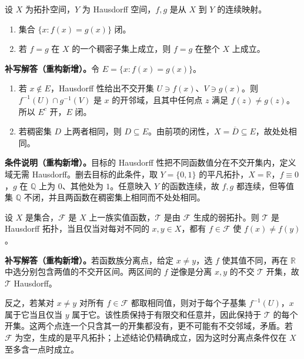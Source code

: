 \documentclass[../../main.tex]{subfiles}%
\begin{document}
\begin{exercise}\label{exercise:ch04-equalizer}
设 $X$ 为拓扑空间，$Y$ 为 Hausdorff 空间，$f,g$ 是从 $X$ 到 $Y$ 的连续映射。
\begin{enumerate}
\item\label{item:ch04-equalizer-closed} 集合 $\{x:f(x)=g(x)\}$ 闭。
\item\label{item:ch04-equalizer-dense} 若 $f=g$ 在 $X$ 的一个稠密子集上成立，则 $f=g$ 在整个 $X$ 上成立。
\end{enumerate}
\end{exercise}
\begin{solution}
\textbf{补写解答（重构新增）。}令 $E=\{x:f(x)=g(x)\}$。
\begin{enumerate}
\item 若 $x\notin E$，Hausdorff 性给出不交开集 $U\ni f(x)$、$V\ni g(x)$。则 $f^{-1}(U)\cap g^{-1}(V)$ 是 $x$ 的开邻域，且其中任何点 $z$ 满足 $f(z)\ne g(z)$。所以 $E^c$ 开，$E$ 闭。
\item 若稠密集 $D$ 上两者相同，则 $D\subseteq E$。由前项的闭性，$X=\overline D\subseteq E$，故处处相同。
\end{enumerate}
\end{solution}
\begin{remark}
\textbf{条件说明（重构新增）。}目标的 Hausdorff 性把不同函数值分在不交开集内，定义域无需 Hausdorff。删去目标的此条件，取 $Y=\{0,1\}$ 的平凡拓扑，$X=\mathbb R$，$f\equiv0$，$g$ 在 $\mathbb Q$ 上为 $0$、其他处为 $1$。任意映入 $Y$ 的函数连续，故 $f,g$ 都连续，但等值集 $\mathbb Q$ 不闭，并且两函数在稠密集上相同而不处处相同。
\end{remark}
\begin{exercise}\label{exercise:ch04-weak-hausdorff}
设 $X$ 是集合，$\mathcal F$ 是 $X$ 上一族实值函数，$\mathcal T$ 是由 $\mathcal F$ 生成的弱拓扑。则 $\mathcal T$ 是 Hausdorff 拓扑，当且仅当对每对不同的 $x,y\in X$，都有 $f\in\mathcal F$ 使 $f(x)\ne f(y)$。
\end{exercise}
\begin{solution}
\textbf{补写解答（重构新增）。}若函数族分离点，给定 $x\ne y$，选 $f$ 使其值不同，再在 $\mathbb R$ 中选分别包含两值的不交开区间。两区间的 $f$ 逆像是分离 $x,y$ 的不交 $\mathcal T$ 开集，故 $\mathcal T$ Hausdorff。

反之，若某对 $x\ne y$ 对所有 $f\in\mathcal F$ 都取相同值，则对于每个子基集 $f^{-1}(U)$，$x$ 属于它当且仅当 $y$ 属于它。该性质保持于有限交和任意并，因此保持于 $\mathcal T$ 的每个开集。这两个点连一个只含其一的开集都没有，更不可能有不交邻域，矛盾。若 $\mathcal F$ 为空，生成的是平凡拓扑；上述结论仍精确成立，因为这时分离点条件仅在 $X$ 至多含一点时成立。
\end{solution}
\end{document}
